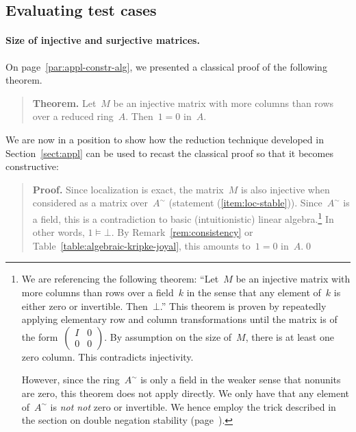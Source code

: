 \documentclass{ws-rv9x6}
\renewcommand{\_}{\mathpunct{.}}
\newcommand{\?}{\,{:}\,}
\newcommand{\notnot}{\emph{not not}\xspace}
\begin{document}
\subsection{Evaluating test cases}
\label{sect:example-applications}

\paragraph{Size of injective and surjective matrices.}

On page~\ref{par:appl-constr-alg}, we presented a classical proof of the
following theorem.\par
\begin{quote}
\textbf{Theorem.} Let~$M$ be an injective matrix with more columns than rows
over a reduced ring~$A$. Then~$1 = 0$ in~$A$.
\end{quote}
We are now in a position to show how the reduction technique developed in
Section~\ref{sect:appl} can be used to recast the classical proof so that it
becomes constructive:

\begin{quote}
\textbf{Proof.} Since localization is exact, the matrix~$M$ is also injective when
considered as a matrix over~$A^\sim$ (statement (\ref{item:loc-stable})).
Since~$A^\sim$ is a field, this is a contradiction to basic (intuitionistic)
linear algebra.\footnote{We are referencing the following theorem: ``Let~$M$ be
an injective matrix with more columns than rows over a field~$k$ in the sense
that any element of~$k$ is either zero or invertible. Then~$\bot$.'' This
theorem is proven by repeatedly applying elementary row and column
transformations until the matrix is of the
form~$\left(\begin{smallmatrix}I&0\\0&0\end{smallmatrix}\right)$. By assumption
on the size of~$M$, there is at least one zero column. This contradicts
injectivity.

However, since the ring~$A^\sim$ is only a field in the weaker sense that
nonunits are zero, this theorem does not apply directly. We only have that any
element of~$A^\sim$ is \notnot zero or invertible. We hence employ the
trick described in the section on double negation stability
(page~\pageref{par:double-negation-stability}).}
In other words, $1 \models \bot$. By
Remark~\ref{rem:consistency} or Table~\ref{table:algebraic-kripke-joyal}, this amounts to~$1 = 0$ in~$A$.\qed
\end{quote}
\end{document}
